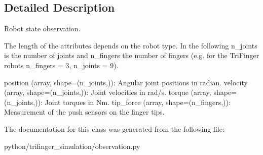 \subsection{Detailed Description}
Robot state observation. 

The length of the attributes depends on the robot type. In the following {\ttfamily n\+\_\+joints} is the number of joints and {\ttfamily n\+\_\+fingers} the number of fingers (e.\+g. for the Tri\+Finger robots {\ttfamily n\+\_\+fingers = 3, n\+\_\+joints = 9}).

\begin{DoxyVerb}    position (array, shape=(n_joints,)):  Angular joint positions in radian.
    velocity (array, shape=(n_joints,)):  Joint velocities in rad/s.
    torque (array, shape=(n_joints,)):  Joint torques in Nm.
    tip_force (array, shape=(n_fingers,)):  Measurement of the push sensors
        on the finger tips.\end{DoxyVerb}
 

The documentation for this class was generated from the following file\+:\begin{DoxyCompactItemize}
\item 
python/trifinger\+\_\+simulation/observation.\+py\end{DoxyCompactItemize}
